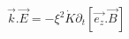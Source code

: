 \begin{equation}
\vec{k}.\vec{E}= -{\xi}^{2}\dot{K}{\partial}_{t}[\vec{e_{z}}.\vec{B}]
\label{27}
\end{equation}

